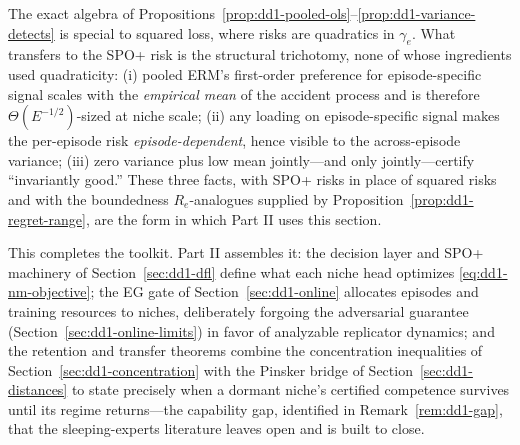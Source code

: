 \begin{remark}
\label{rem:dd1-carryover}
The exact algebra of
Propositions~\ref{prop:dd1-pooled-ols}--\ref{prop:dd1-variance-detects} is
special to squared loss, where risks are quadratics in $\gamma_e$. What
transfers to the SPO+ risk is the structural trichotomy, none of whose
ingredients used quadraticity: (i) pooled ERM's first-order preference for
episode-specific signal scales with the \emph{empirical mean} of the
accident process and is therefore $\Theta(E^{-1/2})$-sized at niche scale;
(ii) any loading on episode-specific signal makes the per-episode risk
\emph{episode-dependent}, hence visible to the across-episode variance;
(iii) zero variance plus low mean jointly---and only jointly---certify
``invariantly good.'' These three facts, with SPO+ risks in place of squared
risks and with the boundedness $R_e$-analogues supplied by
Proposition~\ref{prop:dd1-regret-range}, are the form in which Part II uses
this section.
\end{remark}

This completes the toolkit. Part II assembles it: the decision layer and
SPO+ machinery of Section~\ref{sec:dd1-dfl} define what each niche head
optimizes \eqref{eq:dd1-nm-objective}; the EG gate of
Section~\ref{sec:dd1-online} allocates episodes and training resources to
niches, deliberately forgoing the adversarial guarantee
(Section~\ref{sec:dd1-online-limits}) in favor of analyzable replicator
dynamics; and the retention and transfer theorems combine the concentration
inequalities of Section~\ref{sec:dd1-concentration} with the Pinsker bridge
of Section~\ref{sec:dd1-distances} to state precisely when a dormant niche's
certified competence survives until its regime returns---the capability gap,
identified in Remark~\ref{rem:dd1-gap}, that the sleeping-experts literature
leaves open and \nm{} is built to close.
